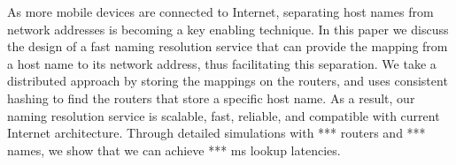 As more mobile devices are connected to Internet, separating host names from network addresses is becoming a key enabling technique. In this paper we discuss the design of a fast naming resolution service that can provide the mapping from a host name to its network address, thus facilitating this separation. We take a distributed approach by storing the mappings on the routers, and uses consistent hashing to find the routers that store a specific host name. As a result, our naming resolution service is scalable, fast, reliable, and compatible with current Internet architecture. Through detailed simulations with *** routers and *** names, we show that we can achieve *** ms lookup latencies.  